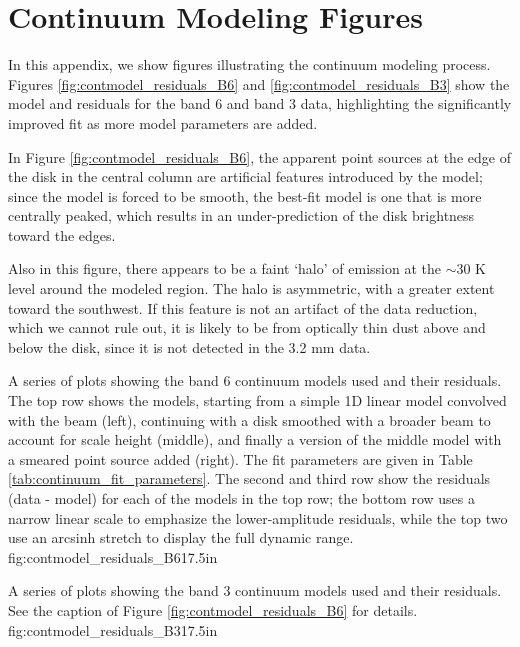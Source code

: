 \documentclass[twocolumn]{aastex62}
\begin{document}
\section{Continuum Modeling Figures}
\label{appendix:contmodel}
In this appendix, we show figures illustrating the continuum modeling process.
Figures \ref{fig:contmodel_residuals_B6} and \ref{fig:contmodel_residuals_B3}
show the model and residuals for the band 6 and band 3 data, highlighting the
significantly improved fit as more model parameters are added.

In Figure \ref{fig:contmodel_residuals_B6}, the apparent point sources at the
edge of the disk in the central column are artificial features introduced by
the model; since the model is forced to be smooth, the best-fit model is one
that is more centrally peaked, which results in an under-prediction of the disk
brightness toward the edges.  

Also in this figure, there appears to be a faint `halo' of emission at the
$\sim30$ K level around the modeled region.  The halo is asymmetric, with a
greater extent toward the southwest.  If this feature is not an artifact of the
data reduction, which we cannot rule out, it is likely to be from optically
thin dust above and below the disk, since it is not detected in the 3.2 mm data.


{A series of plots showing the band 6 continuum models used and their residuals.
The top row shows the models, starting from a simple 1D linear model convolved
with the beam (left), continuing with a disk smoothed with a broader beam to
account for scale height (middle), and finally a version of the middle model
with a smeared point source added (right).  The fit parameters are given in Table
\ref{tab:continuum_fit_parameters}.  The second and third row show the
residuals (data - model) for each of the models in the top row; the bottom row
uses a narrow linear scale to emphasize the lower-amplitude residuals, while
the top two use an arcsinh stretch to display the full dynamic range.
}
{fig:contmodel_residuals_B6}{1}{7.5in}


{A series of plots showing the band 3 continuum models used and their residuals.
See the caption of Figure \ref{fig:contmodel_residuals_B6} for details.
}
{fig:contmodel_residuals_B3}{1}{7.5in}
\end{document}
